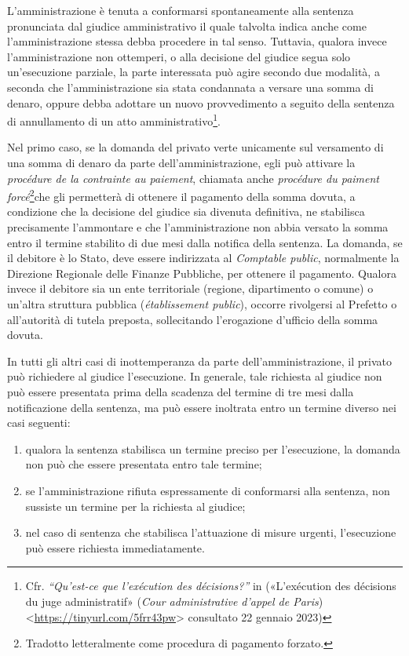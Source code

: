 \documentclass[12pt,it,a4paper,]{report}
\providecommand{\tightlist}{%
  \setlength{\itemsep}{0pt}\setlength{\parskip}{0pt}}
\begin{document}
L'amministrazione è tenuta a conformarsi spontaneamente alla sentenza
pronunciata dal giudice amministrativo il quale talvolta indica anche
come l'amministrazione stessa debba procedere in tal senso. Tuttavia,
qualora invece l'amministrazione non ottemperi, o alla decisione del
giudice segua solo un'esecuzione parziale, la parte interessata può
agire secondo due modalità, a seconda che l'amministrazione sia stata
condannata a versare una somma di denaro, oppure debba adottare un nuovo
provvedimento a seguito della sentenza di annullamento di un atto
amministrativo\footnote{Cfr. \emph{``Qu'est-ce que l'exécution des
  décisions?''} in ({«L'exécution des décisions du juge administratif»}
  (\emph{Cour administrative d'appel de Paris})
  \textless{}\url{https://tinyurl.com/5frr43pw}\textgreater{} consultato
  22 gennaio 2023)}.

Nel primo caso, se la domanda del privato verte unicamente sul
versamento di una somma di denaro da parte dell'amministrazione, egli
può attivare la \emph{procédure de la contrainte au paiement}, chiamata
anche \emph{procédure du paiment forcé}\footnote{Tradotto letteralmente
  come procedura di pagamento forzato.}che gli permetterà di ottenere il
pagamento della somma dovuta, a condizione che la decisione del giudice
sia divenuta definitiva, ne stabilisca precisamente l'ammontare e che
l'amministrazione non abbia versato la somma entro il termine stabilito
di due mesi dalla notifica della sentenza. La domanda, se il debitore è
lo Stato, deve essere indirizzata al \emph{Comptable public},
normalmente la Direzione Regionale delle Finanze Pubbliche, per ottenere
il pagamento. Qualora invece il debitore sia un ente territoriale
(regione, dipartimento o comune) o un'altra struttura pubblica
(\emph{établissement public}), occorre rivolgersi al Prefetto o
all'autorità di tutela preposta, sollecitando l'erogazione d'ufficio
della somma dovuta.

In tutti gli altri casi di inottemperanza da parte dell'amministrazione,
il privato può richiedere al giudice l'esecuzione. In generale, tale
richiesta al giudice non può essere presentata prima della scadenza del
termine di tre mesi dalla notificazione della sentenza, ma può essere
inoltrata entro un termine diverso nei casi seguenti:

\begin{enumerate}
\def\labelenumi{\arabic{enumi})}
\tightlist
\item
  qualora la sentenza stabilisca un termine preciso per l'esecuzione, la
  domanda non può che essere presentata entro tale termine;
\item
  se l'amministrazione rifiuta espressamente di conformarsi alla
  sentenza, non sussiste un termine per la richiesta al giudice;
\item
  nel caso di sentenza che stabilisca l'attuazione di misure urgenti,
  l'esecuzione può essere richiesta immediatamente.
\end{enumerate}
\end{document}
